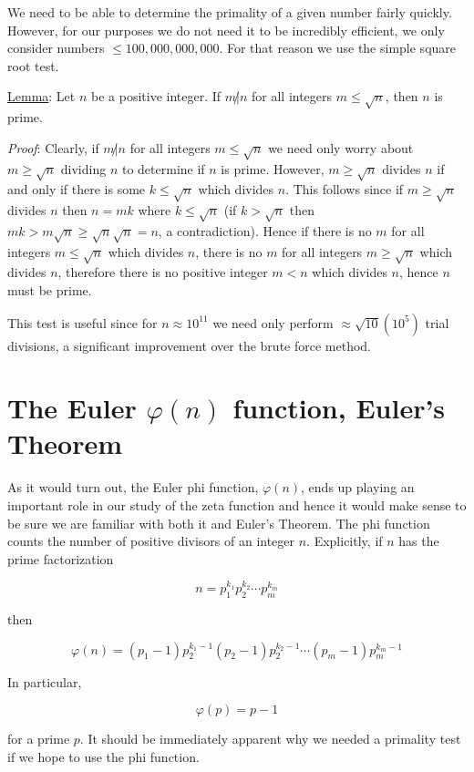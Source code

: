 \documentclass{amsart}
\begin{document}
We need to be able to determine the primality of a given number fairly quickly. However, for our purposes we do not need it to be incredibly efficient, we only consider numbers \(\le100,000,000,000\). For that reason we use the simple square root test.

\hfill\break

\noindent\underline{Lemma}: Let \(n\) be a positive integer. If \(m\not|n\) for all integers \(m\le\sqrt{n}\), then \(n\) is prime.

\noindent\textit{Proof}: Clearly, if \(m\not|n\) for all integers \(m\le\sqrt{n}\) we need only worry about \(m\ge\sqrt{n}\) dividing \(n\) to determine if \(n\) is prime. However, \(m\ge\sqrt{n}\) divides \(n\) if and only if there is some \(k\le\sqrt{n}\) which divides \(n\). This follows since if $m\ge\sqrt{n}$ divides $n$ then $n=mk$ where $k\le\sqrt{n}$ (if $k>\sqrt{n}$ then $mk>m\sqrt{n}\ge\sqrt{n}\sqrt{n}=n$, a contradiction). Hence if there is no \(m\) for all integers \(m\le\sqrt{n}\) which divides $n$, there is no \(m\) for all integers \(m\ge\sqrt{n}\) which divides $n$, therefore there is no positive integer $m<n$ which divides $n$, hence $n$ must be prime.

\hfill\break

This test is useful since for $n\approx10^{11}$ we need only perform $\approx\sqrt{10}(10^{5})$ trial divisions, a significant improvement over the brute force method.

\hfill\break

\section{The Euler \(\varphi(n)\) function, Euler's Theorem}

As it would turn out, the Euler phi function, $\varphi(n)$, ends up playing an important role in our study of the zeta function and hence it would make sense to be sure we are familiar with both it and Euler's Theorem. The phi function counts the number of positive divisors of an integer $n$. Explicitly, if $n$ has the prime factorization

$$n=p_1^{k_1}p_2^{k_2}\cdots p_m^{k_m}$$

then

$$\varphi(n)=(p_1-1)p_2^{k_1-1}(p_2-1)p_2^{k_2-1}\cdots(p_m-1)p_m^{k_m-1}$$

In particular,

$$\varphi(p)=p-1$$

for a prime $p$. It should be immediately apparent why we needed a primality test if we hope to use the phi function. 
\end{document}
